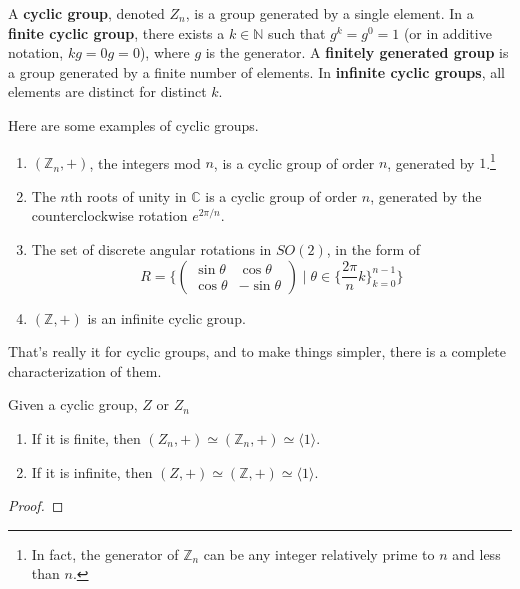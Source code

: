   \begin{definition}
    A \textbf{cyclic group}, denoted $Z_{n}$, is a group generated by a single element. In a \textbf{finite cyclic group}, there exists a $k \in \mathbb{N}$ such that $g^{k} = g^{0} = 1$ (or in additive notation, $kg = 0g = 0$), where $g$ is the generator. A \textbf{finitely generated group} is a group generated by a finite number of elements. In \textbf{infinite cyclic groups}, all elements are distinct for distinct $k$. 
  \end{definition}

  \begin{example} 
    Here are some examples of cyclic groups. 
    \begin{enumerate}
      \item $(\mathbb{Z}_n, +)$, the integers mod $n$, is a cyclic group of order $n$, generated by $1$.\footnote{In fact, the generator of $\mathbb{Z}_n$ can be any integer relatively prime to $n$ and less than $n$.} 
      \item The $n$th roots of unity in $\mathbb{C}$ is a cyclic group of order $n$, generated by the counterclockwise rotation $e^{2\pi/n}$. 
      \item The set of discrete angular rotations in $SO(2)$, in the form of 
      \begin{equation}
        R =  \bigg\{ \begin{pmatrix}
        \sin{\theta} & \cos{\theta} \\
        \cos{\theta} & -\sin{\theta}
        \end{pmatrix}\; \bigg| \; \theta \in \Big\{\frac{2 \pi}{n} k\Big\}_{k = 0}^{n-1} \bigg\}
      \end{equation}

      \item $(\mathbb{Z}, +)$ is an infinite cyclic group. 
    \end{enumerate}
  \end{example}

  That's really it for cyclic groups, and to make things simpler, there is a complete characterization of them. 

  \begin{theorem}
    Given a cyclic group, $Z$ or $Z_n$ 
    \begin{enumerate}
      \item If it is finite, then $(Z_n, +) \simeq (\mathbb{Z}_n, +) \simeq \langle 1 \rangle$. 
      \item If it is infinite, then $(Z, +) \simeq (\mathbb{Z}, +) \simeq \langle 1 \rangle$. 
    \end{enumerate}
  \end{theorem}
  \begin{proof}
    
  \end{proof}

